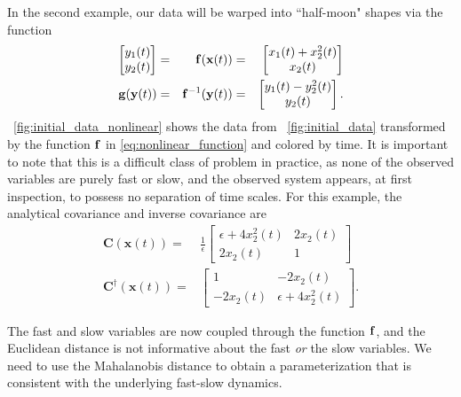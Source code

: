 In the second example, our data will be warped into ``half-moon" shapes via the function
\begin{equation} \label{eq:nonlinear_function}
\begin{aligned}
\begin{bmatrix}
y_1(t) \\ y_2(t)
\end{bmatrix} &=&
\mathbf{f}(\mathbf{x}(t)) &=&
\begin{bmatrix}
x_1(t) + x_2^2(t) \\
x_2(t)
\end{bmatrix}\\
\mathbf{g}(\mathbf{y}(t)) &=& \mathbf{f}^{-1} (\mathbf{y}(t)) &=& \begin{bmatrix} y_1(t) - y_2^2(t) \\ y_2(t) \end{bmatrix} .
\end{aligned}
\end{equation}
%
\fig~\ref{fig:initial_data_nonlinear} shows the data from \fig~\ref{fig:initial_data} transformed by the function $\mathbf{f}$ in \eqref{eq:nonlinear_function} and colored by time.
%
It is important to note that this is a difficult class of problem in practice, as none of the observed
variables are purely fast or slow, and the observed system appears, at first inspection, to possess no separation
of time scales.
%
For this example, the analytical covariance and inverse covariance are
\begin{equation}
\begin{aligned}
\mathbf{C}(\mathbf{x}(t)) =&
\frac{1}{\epsilon}
 \begin{bmatrix}
\epsilon + 4x_2^2(t) & 2x_2(t) \\
2x_2(t) & 1
\end{bmatrix}\\
\mathbf{C}^{\dagger}(\mathbf{x}(t)) =&
\begin{bmatrix}
1 & -2 x_2(t) \\
-2 x_2(t) & \epsilon+ 4 x_2^2(t)
\end{bmatrix} .
\end{aligned}
\end{equation}

The fast and slow variables are now coupled through the function $\mathbf{f}$, and the Euclidean distance is not informative about the fast {\em or} the slow variables.
%
We need to use the Mahalanobis distance to obtain a parameterization that is consistent with the underlying fast-slow dynamics.

